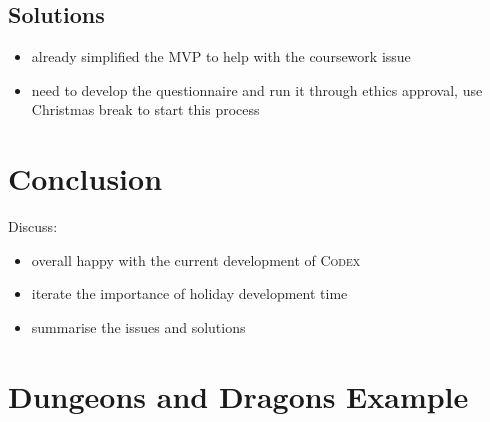 \documentclass[progress]{cmpreport}
\newcommand{\Codex}{\textsc{Codex}}
\begin{document}
		\subsection{Solutions}
		\begin{itemize}
			\item already simplified the MVP to help with the coursework issue
			\item need to develop the questionnaire and run it through ethics approval, use Christmas break to start this process
		\end{itemize}
	\section{Conclusion}
	Discuss:
	\begin{itemize}
		\item overall happy with the current development of \Codex
			\subitem 
		\item iterate the importance of holiday development time
		\item summarise the issues and solutions
	\end{itemize}

	\clearpage
	\appendix
	\section{Dungeons and Dragons Example} \label{app:example}
	
\end{document}
